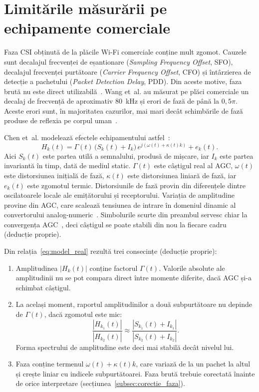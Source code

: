 \section{Limitările măsurării pe echipamente comerciale}\label{sec:limitari}

Faza CSI obținută de la plăcile Wi-Fi comerciale conține mult zgomot.
Cauzele sunt decalajul frecvenței de eșantionare (\emph{Sampling Frequency Offset}, SFO), decalajul frecvenței purtătoare (\emph{Carrier Frequency Offset}, CFO) și întârzierea de detecție a pachetului (\emph{Packet Detection Delay}, PDD).
Din aceste motive, faza brută nu este direct utilizabilă~\cite[p.~121:5]{zeng2019farsense}.
Wang et~al. au măsurat pe plăci comerciale un decalaj de frecvență de aproximativ 80~kHz și erori de fază de până la $0{,}5\pi$.
Aceste erori sunt, în majoritatea cazurilor, mai mari decât schimbările de fază produse de reflexia pe corpul uman~\cite[Sec.~3.3]{wang2015carm}.

Chen et~al. modelează efectele echipamentului astfel~\cite[ec.~(10)]{chen2018trbreath}:
\begin{equation}\label{eq:model_real}
	H_k(t) = \Gamma(t)\,\bigl(S_k(t) + I_k\bigr)\, e^{j(\omega(t) + \kappa(t) k)} + e_k(t).
\end{equation}
Aici $S_k(t)$ este partea utilă a semnalului, produsă de mișcare, iar $I_k$ este partea invariantă în timp, dată de mediul static.
$\Gamma(t)$ este câștigul real al AGC, $\omega(t)$ este distorsiunea inițială de fază, $\kappa(t)$ este distorsiunea liniară de fază, iar $e_k(t)$ este zgomotul termic.
Distorsiunile de fază provin din diferențele dintre oscilatoarele locale ale emițătorului și receptorului.
Variația de amplitudine provine din AGC, care scalează tensiunea de intrare în domeniul dinamic al convertorului analog-numeric~\cite[Sec.~II-C]{chen2018trbreath}.
Simbolurile scurte din preambul servesc chiar la convergența AGC~\cite[Sec.~17.3.2.1]{ieee80211a}, deci câștigul se poate stabili din nou la fiecare cadru (deducție proprie).

Din relația~\eqref{eq:model_real} rezultă trei consecințe (deducție proprie):
\begin{enumerate}
	\item Amplitudinea $|H_k(t)|$ conține factorul $\Gamma(t)$. Valorile absolute ale amplitudinii nu se pot compara direct între momente diferite, dacă AGC și-a schimbat câștigul.
	\item La același moment, raportul amplitudinilor a două subpurtătoare nu depinde de $\Gamma(t)$, dacă zgomotul este mic:
	\begin{equation}\label{eq:raport}
		\frac{|H_{k_1}(t)|}{|H_{k_2}(t)|} \approx \frac{|S_{k_1}(t) + I_{k_1}|}{|S_{k_2}(t) + I_{k_2}|}.
	\end{equation}
	Forma spectrului de amplitudine este deci mai stabilă decât nivelul lui.
	\item Faza conține termenul $\omega(t) + \kappa(t)k$, care variază de la un pachet la altul și crește liniar cu indicele subpurtătoarei. Faza brută trebuie corectată înainte de orice interpretare (secțiunea~\ref{subsec:corectie_faza}).
\end{enumerate}

